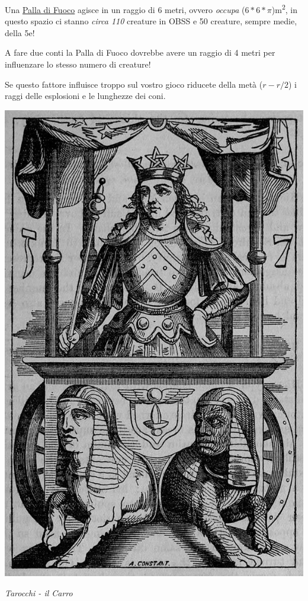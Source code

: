\begin{multicols}{2}
Una \hyperlink{Palla di Fuoco}{Palla di Fuoco} agisce in un raggio di 6 metri, ovvero \emph{occupa} ($6*6*\pi$)\si{m^{2}}, in questo spazio ci stanno \emph{circa 110} creature in OBSS e 50 creature, sempre medie, della 5e!

A fare due conti la Palla di Fuoco dovrebbe avere un raggio di 4 metri per influenzare lo stesso numero di creature!

Se questo fattore influisce troppo sul vostro gioco riducete della metà ($r-r/2$) i raggi delle esplosioni e le lunghezze dei coni. 


\begin{center}
	\includegraphics[width=0.7\linewidth]{immagini/The_Chariot_of_Hermes.png}
	
	\emph{Tarocchi - il Carro}
\end{center}

\end{multicols}


\vfill




